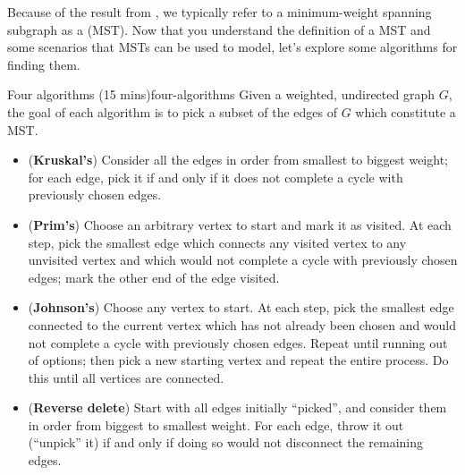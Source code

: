 \documentclass{tufte-handout}
\begin{document}
\pause

Because of the result from , we typically refer to
a minimum-weight spanning subgraph as a 
(MST).  Now that you understand the definition of a MST and some
scenarios that MSTs can be used to model, let's explore some
algorithms for finding them.

\begin{model*}{Four algorithms (15 mins)}{four-algorithms}
  Given a weighted, undirected graph $G$, the goal of each algorithm
  is to pick a subset of the edges of $G$ which constitute a MST.
  \begin{itemize}
  \item (\textbf{Kruskal's}) Consider all the edges in order from
    smallest to biggest weight; for each edge, pick it if and only if
    it does not complete a cycle with previously chosen edges.
  \item (\textbf{Prim's}) Choose an arbitrary vertex to start and mark
    it as visited.  At each step, pick the smallest edge which
    connects any visited vertex to any unvisited vertex and which would
    not complete a cycle with previously chosen edges; mark the other
    end of the edge visited.
  \item (\textbf{Johnson's}) Choose any vertex to start.  At each step,
    pick the smallest edge connected to the current vertex which has
    not already been chosen and would not complete a cycle with
    previously chosen edges.  Repeat until running out of options;
    then pick a new starting vertex and repeat the entire process.  Do
    this until all vertices are connected.
  \item (\textbf{Reverse delete}) Start with all edges initially
    ``picked'', and consider them in order from biggest to smallest
    weight.  For each edge, throw it out (\ie ``unpick'' it) if and
    only if doing so would not disconnect the remaining edges.
  \end{itemize}
\end{model*}
\end{document}
